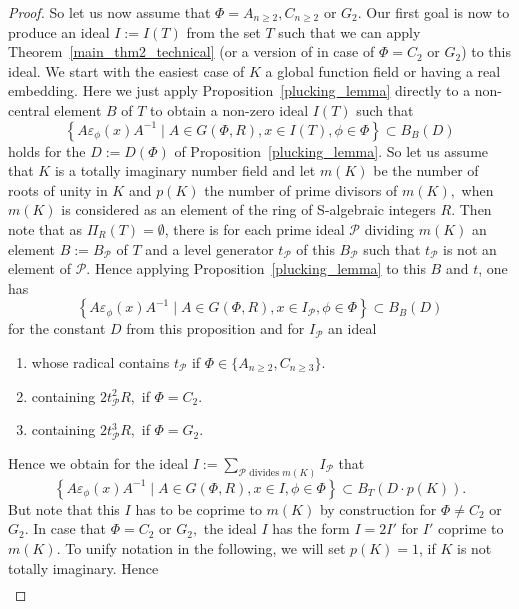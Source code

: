 \documentclass[12pt]{amsart}
\newcommand{\C}[1]{{\mathcal #1}}
\theoremstyle{definition}\newtheorem{definition}[theorem]{Definition}
\theoremstyle{remark}\newtheorem{remark}[theorem]{Remark}
\theoremstyle{definition}\newtheorem{case}{Case}
\begin{document}
\begin{proof}
So let us now assume that $\Phi=A_{n\geq 2},C_{n\geq 2}$ or $G_2.$ Our first goal is now to produce an ideal $I:=I(T)$ from the set $T$ such that we can apply Theorem~\ref{main_thm2_technical} (or a version of \cite[Theorem~1.3]{Chevalley_positive_char_tentative} in case of $\Phi=C_2$ or $G_2$) to this ideal. We start with the easiest case of $K$ a global function field or having a real embedding. Here we just apply Proposition~\ref{plucking_lemma} directly to a non-central element $B$ of $T$ to obtain a non-zero ideal $I(T)$ such that 
\[
\left\{A\varepsilon_{\phi}(x)A^{-1}\mid A\in G(\Phi,R),x\in I(T),\phi\in\Phi\right\}\subset B_B(D)
\]
holds for the $D:=D(\Phi)$ of Proposition~\ref{plucking_lemma}. So let us assume that $K$ is a totally imaginary number field and let $m(K)$ be the number of roots of unity in $K$ and $p(K)$ the number of prime divisors of $m(K),$ when $m(K)$ is considered as an element of the ring of S-algebraic integers $R.$ Then note that as $\Pi_R(T)=\emptyset$, there is for each prime ideal $\C P$ dividing $m(K)$ an element $B:=B_{\C P}$ of $T$ and a level generator $t_{\C P}$ of this $B_{\C P}$ such that $t_{\C P}$ is not an element of $\C P.$ Hence applying Proposition~\ref{plucking_lemma} to this $B$ and $t$, one has
\begin{equation}
\left\{A\varepsilon_{\phi}(x)A^{-1}\mid A\in G(\Phi,R),x\in I_{\C P},\phi\in\Phi\right\}\subset B_B(D)
\end{equation}
for the constant $D$ from this proposition and for $I_{\C P}$ an ideal 
\begin{enumerate}
\item whose radical contains $t_{\C P}$ if $\Phi\in\{A_{n\geq 2},C_{n\geq 3}\}$.
\item containing $2t_{\C P}^2R,$ if $\Phi=C_2.$
\item containing $2t_{\C P}^3R,$ if $\Phi=G_2.$
\end{enumerate}
Hence we obtain for the ideal $I:=\sum_{\C P\text{ divides }m(K)} I_{\C P}$ that 
\begin{equation}
\left\{A\varepsilon_{\phi}(x)A^{-1}\mid A\in G(\Phi,R),x\in I,\phi\in\Phi\right\}\subset B_T(D\cdot p(K)).
\end{equation}
But note that this $I$ has to be coprime to $m(K)$ by construction for $\Phi\neq C_2$ or $G_2$. In case that $\Phi=C_2$ or $G_2,$ the ideal $I$ has the form $I=2I'$ for $I'$ coprime to $m(K).$ To unify notation in the following, we will set $p(K)=1$, if $K$ is not totally imaginary. Hence
 \begin{align*}

\end{align*}
\end{proof}
\end{document}

